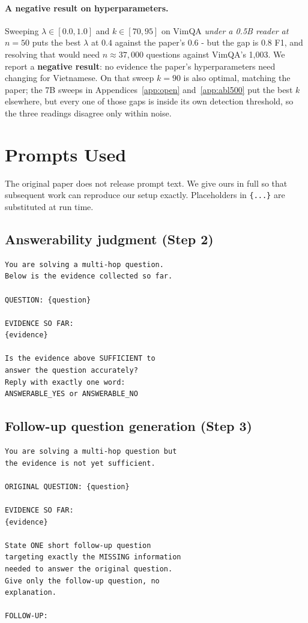 \documentclass[11pt]{article}
\begin{document}
\paragraph{A negative result on hyperparameters.} Sweeping
$\lambda \in [0.0, 1.0]$ and $k \in [70, 95]$ on VimQA \emph{under a 0.5B
reader at $n=50$} puts the best $\lambda$ at $0.4$ against the paper's $0.6$ -
but the gap is $0.8$ F1, and resolving that would need $n \approx 37{,}000$
questions against VimQA's 1,003. We report a \textbf{negative result}: no
evidence the paper's hyperparameters need changing for Vietnamese. On that sweep
$k=90$ is also optimal, matching the paper; the 7B sweeps in
Appendices~\ref{app:open} and~\ref{app:abl500} put the best $k$ elsewhere, but
every one of those gaps is inside its own detection threshold, so the three
readings disagree only within noise.


\section{Prompts Used}
\label{app:prompts}

The original paper does not release prompt text. We give ours in full so that
subsequent work can reproduce our setup exactly. Placeholders in
\texttt{\{...\}} are substituted at run time.

\subsection{Answerability judgment (Step 2)}
{\small\begin{verbatim}
You are solving a multi-hop question.
Below is the evidence collected so far.

QUESTION: {question}

EVIDENCE SO FAR:
{evidence}

Is the evidence above SUFFICIENT to
answer the question accurately?
Reply with exactly one word:
ANSWERABLE_YES or ANSWERABLE_NO
\end{verbatim}}

\subsection{Follow-up question generation (Step 3)}
{\small\begin{verbatim}
You are solving a multi-hop question but
the evidence is not yet sufficient.

ORIGINAL QUESTION: {question}

EVIDENCE SO FAR:
{evidence}

State ONE short follow-up question
targeting exactly the MISSING information
needed to answer the original question.
Give only the follow-up question, no
explanation.

FOLLOW-UP:
\end{verbatim}}
\end{document}
